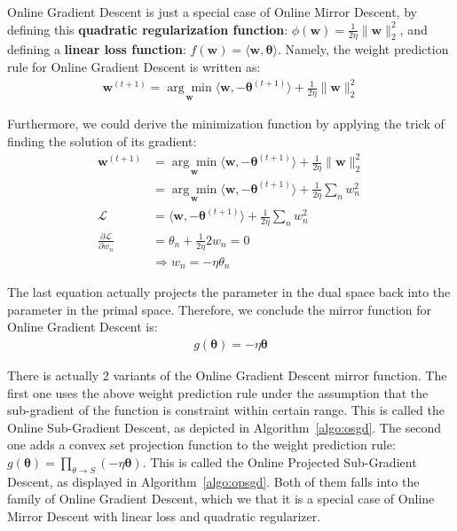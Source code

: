 \documentclass[11pt]{article}
\newcommand{\btheta}{\boldsymbol{\theta}}
\newcommand{\bw}{\boldsymbol{w}}
\begin{document}
Online Gradient Descent is just a special case of Online Mirror Descent, by defining 
this \textbf{quadratic regularization function}: $\phi(\bw) = \frac{1}{2\eta}\|\bw\|^2_2$, and defining a \textbf{linear loss function}: $f(\bw)=\langle \bw, \btheta \rangle$. Namely, the weight prediction rule for Online Gradient Descent is written as:
\begin{equation*}
\begin{split}
\bw^{(t+1)} = \underset{\bw}{\arg\min} \langle \bw,-\btheta^{(t+1)} \rangle
+\frac{1}{2\eta}\|\bw\|^2_2
\end{split}
\end{equation*}

Furthermore, we could derive the minimization function by applying the trick of finding the solution of its gradient:
\begin{equation*}
\begin{split}
\bw^{(t+1)} 
&= \underset{\bw}{\arg\min} \langle \bw,-\btheta^{(t+1)} \rangle
+\frac{1}{2\eta}\|\bw\|^2_2 \\
&= \underset{\bw}{\arg\min} \langle \bw,-\btheta^{(t+1)} \rangle
+\frac{1}{2\eta}\sum_n w^2_n \\
\mathcal{L} &= \langle \bw,-\btheta^{(t+1)} \rangle
+\frac{1}{2\eta}\sum_n w^2_n \\
\frac{\partial\mathcal{L}}{\partial w_n}
&= \theta_n + \frac{1}{2\eta} 2w_n = 0 \\
&\Rightarrow w_n = -\eta \theta_n
\end{split}
\end{equation*}

The last equation actually projects the parameter in the dual space back into the parameter in the primal space.
Therefore, we conclude the mirror function for Online Gradient Descent is:
\begin{equation*}
\begin{split}
g(\btheta) = -\eta \btheta
\end{split}
\end{equation*}


There is actually 2 variants of the Online Gradient Descent mirror function. The first one uses the above weight prediction rule under the assumption that the sub-gradient of the function is constraint within certain range. This is called the Online Sub-Gradient Descent, as depicted in Algorithm~\ref{algo:osgd}. The second one adds a convex set projection function to the weight prediction rule: $g(\btheta) = \prod_{\theta \rightarrow S} (-\eta \btheta)$. This is called the Online Projected Sub-Gradient Descent, as displayed in Algorithm~\ref{algo:opsgd}. Both of them falls into the family of Online Gradient Descent, which we that it is a special case of Online Mirror Descent with linear loss and quadratic regularizer.
\end{document}
